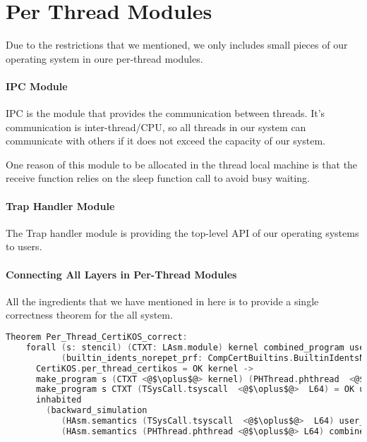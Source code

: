 \section{Per Thread Modules}
\label{chapter:certikos:sec:per-thread-modules}

Due to the restrictions that we mentioned,
we only includes small pieces of our operating system in oure per-thread modules.

\paragraph{IPC Module}

IPC is the module that provides the communication between threads.
It's communication is inter-thread/CPU, so all threads in our system can communicate with others if it does not exceed the capacity of our system. 

One reason of this module to be allocated in the thread local machine is that 
the receive function relies on the sleep function call to avoid busy waiting. 

\paragraph{Trap Handler Module}

The Trap handler module is providing the top-level API of our operating systems to users.  

\paragraph{Connecting All Layers in Per-Thread Modules}

All the ingredients that we have mentioned in here is to provide a single correctness 
theorem for the all system. 


\begin{lstlisting}[language=C]
  Theorem Per_Thread_CertiKOS_correct:
    forall (s: stencil) (CTXT: LAsm.module) kernel combined_program user_program
           (builtin_idents_norepet_prf: CompCertBuiltins.BuiltinIdentsNorepet),
      CertiKOS.per_thread_certikos = OK kernel ->
      make_program s (CTXT <@$\oplus$@> kernel) (PHThread.phthread  <@$\oplus$@>  L64) = OK combined_program ->
      make_program s CTXT (TSysCall.tsyscall  <@$\oplus$@>  L64) = OK user_program ->
      inhabited
        (backward_simulation
           (HAsm.semantics (TSysCall.tsyscall  <@$\oplus$@>  L64) user_program)
           (HAsm.semantics (PHThread.phthread <@$\oplus$@> L64) combined_program)).
\end{lstlisting}